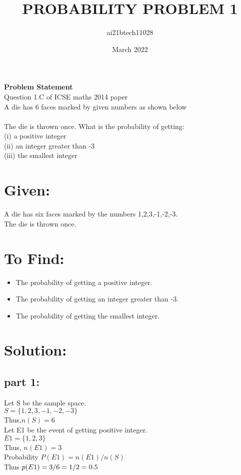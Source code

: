 \documentclass[twocolumn]{article}
\title{PROBABILITY PROBLEM 1}
\author{ai21btech11028 }
\date{March 2022}
\begin{document}
\maketitle
\textbf{Problem Statement}\\
Question 1.C of ICSE maths 2014 paper\\
A die has 6 faces marked by given numbers as shown below\\
\hspace{0.3cm}\hspace{0.3cm}\hspace{0.3cm}\hspace{0.3cm}\hspace{0.3cm}\\
The die is thrown once. What is the probability of getting:\\
(i)   a positive integer\\
(ii)  an integer greater than -3\\
(iii)  the smallest integer\\


\section{Given:}
A die has six faces marked by the numbers 1,2,3,-1,-2,-3.\\
The die is thrown once.
\section{To Find:}
\begin{itemize}
    \item The probability of getting a positive integer.
    \item The probability of getting an integer greater than -3.
    \item The probability of getting the smallest integer.
\end{itemize}
\section{Solution: }
\subsection{part 1:}
Let S be the sample space.\\
$S=\{1,2,3,-1,-2,-3\}$\\
Thus,$ n (S) = 6$\\
Let E1 be the event of getting positive integer.\\
$E1 = \{1,2,3\}$\\
Thus, $ n (E1) = 3$\\
Probability  $ P (E1) = n (E1)/n (S)$\\
Thus   $p (E1) =3/6\\
             =1/2\\
             =0.5$
\end{document}
